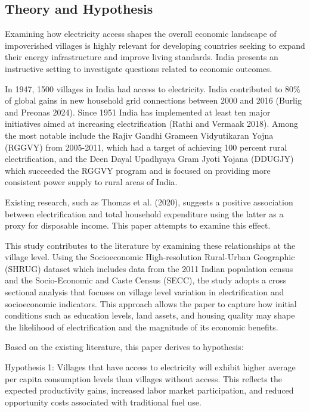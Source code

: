 \documentclass[
]{article}
\begin{document}
\hypertarget{theory-and-hypothesis}{%
\subsection{Theory and Hypothesis}\label{theory-and-hypothesis}}

Examining how electricity access shapes the overall economic landscape
of impoverished villages is highly relevant for developing countries
seeking to expand their energy infrastructure and improve living
standards. India presents an instructive setting to investigate
questions related to economic outcomes.

In 1947, 1500 villages in India had access to electricity. India
contributed to 80\% of global gains in new household grid connections
between 2000 and 2016 (Burlig and Preonas 2024). Since 1951 India has
implemented at least ten major initiatives aimed at increasing
electrification (Rathi and Vermaak 2018). Among the most notable include
the Rajiv Gandhi Grameen Vidyutikaran Yojna (RGGVY) from 2005-2011,
which had a target of achieving 100 percent rural electrification, and
the Deen Dayal Upadhyaya Gram Jyoti Yojana (DDUGJY) which succeeded the
RGGVY program and is focused on providing more consistent power supply
to rural areas of India.

Existing research, such as Thomas et al. (2020), suggests a positive
association between electrification and total household expenditure
using the latter as a proxy for disposable income. This paper attempts
to examine this effect.

This study contributes to the literature by examining these
relationships at the village level. Using the Socioeconomic
High-resolution Rural-Urban Geographic (SHRUG) dataset which includes
data from the 2011 Indian population census and the Socio-Economic and
Caste Census (SECC), the study adopts a cross sectional analysis that
focuses on village level variation in electrification and socioeconomic
indicators. This approach allows the paper to capture how initial
conditions such as education levels, land assets, and housing quality
may shape the likelihood of electrification and the magnitude of its
economic benefits.

Based on the existing literature, this paper derives to hypothesis:

Hypothesis 1: Villages that have access to electricity will exhibit
higher average per capita consumption levels than villages without
access. This reflects the expected productivity gains, increased labor
market participation, and reduced opportunity costs associated with
traditional fuel use.
\end{document}
